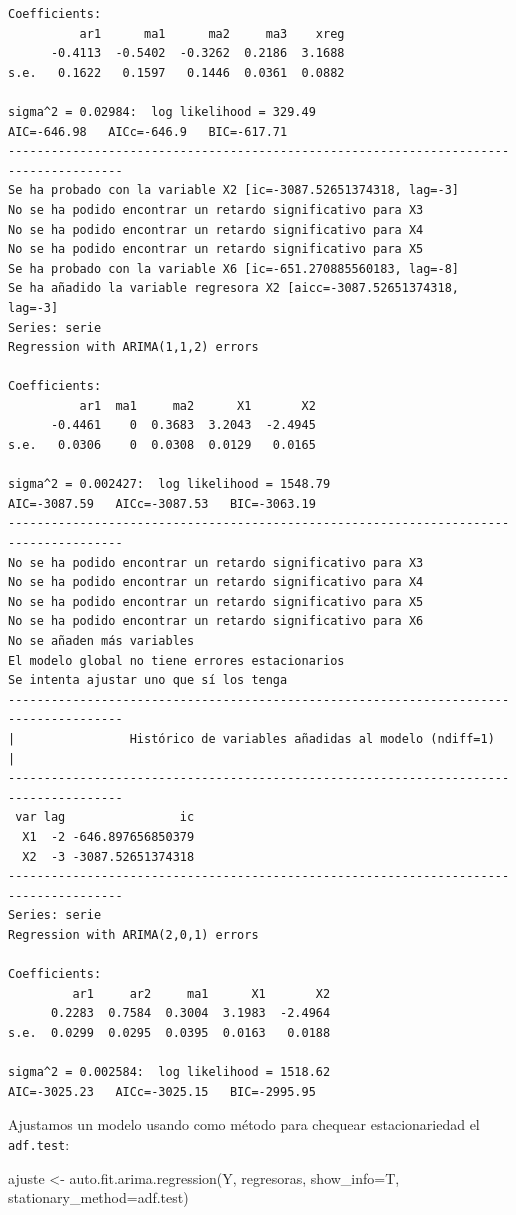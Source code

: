 \documentclass[
  12pt,
  a4paper]{article}
\newenvironment{Shaded}{\begin{snugshade}}{\end{snugshade}}
\newcommand{\AttributeTok}[1]{\textcolor[rgb]{0.77,0.63,0.00}{#1}}
\newcommand{\FunctionTok}[1]{\textcolor[rgb]{0.00,0.00,0.00}{#1}}
\newcommand{\NormalTok}[1]{#1}
\newcommand{\OtherTok}[1]{\textcolor[rgb]{0.56,0.35,0.01}{#1}}
\newcommand{\StringTok}[1]{\textcolor[rgb]{0.31,0.60,0.02}{#1}}
\begin{document}
\begin{verbatim}
Coefficients:
          ar1      ma1      ma2     ma3    xreg
      -0.4113  -0.5402  -0.3262  0.2186  3.1688
s.e.   0.1622   0.1597   0.1446  0.0361  0.0882

sigma^2 = 0.02984:  log likelihood = 329.49
AIC=-646.98   AICc=-646.9   BIC=-617.71
--------------------------------------------------------------------------------------
Se ha probado con la variable X2 [ic=-3087.52651374318, lag=-3]
No se ha podido encontrar un retardo significativo para X3
No se ha podido encontrar un retardo significativo para X4
No se ha podido encontrar un retardo significativo para X5
Se ha probado con la variable X6 [ic=-651.270885560183, lag=-8]
Se ha añadido la variable regresora X2 [aicc=-3087.52651374318, lag=-3]
Series: serie 
Regression with ARIMA(1,1,2) errors 

Coefficients:
          ar1  ma1     ma2      X1       X2
      -0.4461    0  0.3683  3.2043  -2.4945
s.e.   0.0306    0  0.0308  0.0129   0.0165

sigma^2 = 0.002427:  log likelihood = 1548.79
AIC=-3087.59   AICc=-3087.53   BIC=-3063.19
--------------------------------------------------------------------------------------
No se ha podido encontrar un retardo significativo para X3
No se ha podido encontrar un retardo significativo para X4
No se ha podido encontrar un retardo significativo para X5
No se ha podido encontrar un retardo significativo para X6
No se añaden más variables
El modelo global no tiene errores estacionarios
Se intenta ajustar uno que sí los tenga
--------------------------------------------------------------------------------------
|                Histórico de variables añadidas al modelo (ndiff=1)                 |
--------------------------------------------------------------------------------------
 var lag                ic
  X1  -2 -646.897656850379
  X2  -3 -3087.52651374318
--------------------------------------------------------------------------------------
Series: serie 
Regression with ARIMA(2,0,1) errors 

Coefficients:
         ar1     ar2     ma1      X1       X2
      0.2283  0.7584  0.3004  3.1983  -2.4964
s.e.  0.0299  0.0295  0.0395  0.0163   0.0188

sigma^2 = 0.002584:  log likelihood = 1518.62
AIC=-3025.23   AICc=-3025.15   BIC=-2995.95
\end{verbatim}

Ajustamos un modelo usando como método para chequear estacionariedad el
\texttt{adf.test}:

\begin{Shaded}
\begin{Highlighting}[]
\NormalTok{ajuste }\OtherTok{\textless{}{-}} \FunctionTok{auto.fit.arima.regression}\NormalTok{(Y, regresoras, }\AttributeTok{show\_info=}\NormalTok{T,}
                                    \AttributeTok{stationary\_method=}\StringTok{\textquotesingle{}adf.test\textquotesingle{}}\NormalTok{)}
\end{Highlighting}
\end{Shaded}
\end{document}
